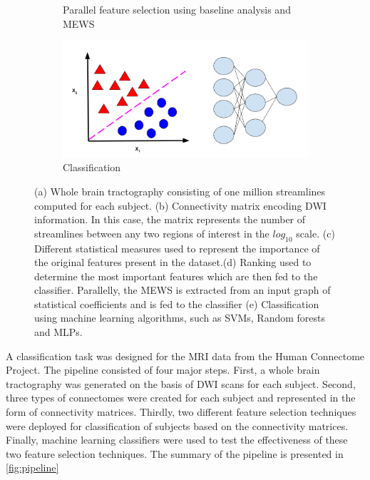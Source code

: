 \documentclass[msthesis.tex]{subfiles}
\begin{document}
\begin{figure}
\begin{subfigure}[b]{0.9\textwidth}
\begin{subfigure}[b]{0.4\textwidth}
         \label{fig:mewspip}
         \end{subfigure}
    \vspace{-2em}
     \caption{Parallel feature selection using baseline analysis and MEWS}
    \end{subfigure}
    \vfill
        \begin{subfigure}[b]{0.6\textwidth}
         \centering
         \includegraphics[height =0.4\textwidth,width=\textwidth]{images/classification.png}
         \caption{Classification}
         \label{fig:three sin x}
         \end{subfigure}
    \caption{(a) Whole brain tractography consisting of one million streamlines computed for each subject. (b) Connectivity matrix encoding DWI information. In this case, the matrix represents the number of streamlines between any two regions of interest in the $log_{10}$ scale. (c) Different statistical measures used to represent the importance of the original features present in the dataset.(d) Ranking used to determine the most important features which are then fed to the classifier. Parallelly, the MEWS is extracted from an input graph of statistical coefficients and is fed to the classifier (e) Classification using machine learning algorithms, such as SVMs, Random forests and MLPs.}
    \label{fig:pipeline}
\end{figure}

A classification task was designed for the MRI data from the Human Connectome Project. The pipeline consisted of four major steps. First, a whole brain tractography was generated on the basis of DWI scans for each subject. Second,  three types of connectomes were created for each subject and represented in the form of connectivity matrices. Thirdly, two different feature selection techniques were deployed for classification of subjects based on the connectivity matrices. Finally, machine learning classifiers were used to test the effectiveness of these two feature selection techniques. The summary of the pipeline is presented in \autoref{fig:pipeline}
\end{document}
